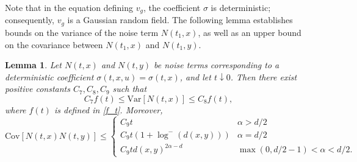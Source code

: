 \documentclass[12pt]{amsart}
\newtheorem{lemma}{Lemma}[section]
\numberwithin{equation}{section}
\newcommand{\1}{\mathbf{1}}
\begin{document}
Note that in the equation defining $v_g$, the coefficient $\sigma$ is deterministic; consequently, $v_g$ is a Gaussian random field. The following lemma establishes bounds on the variance of the noise term $N(t_1,x)$, as well as an upper bound on the covariance between $N(t_1,x)$ and $N(t_1,y)$.
\begin{lemma}
    Let $N(t,x)$ and $N(t,y)$ be noise terms corresponding to a deterministic coefficient $\sigma(t,x,u)=\sigma(t,x)$, and let $t\downarrow0$. Then there exist positive constants $C_7,C_8,C_9$ such that
    \begin{equation}
    \label{varbound}
        C_7f(t)\leq \text{Var}[N(t,x)]\leq C_8f(t),
    \end{equation}
    where $f(t)$ is defined in \eqref{f_t}. Moreover,
    \begin{equation}
    \label{covbound}
        \text{Cov}[N(t,x)N(t,y)]\leq\begin{cases}
        C_9t & \alpha>d/2\\
        C_9t(1+\log^-(d(x,y))) & \alpha=d/2\\
        C_9td(x,y)^{2\alpha-d} & \max(0,d/2-1)<\alpha<d/2.
        \end{cases}
    \end{equation}
\end{lemma}
\end{document}
